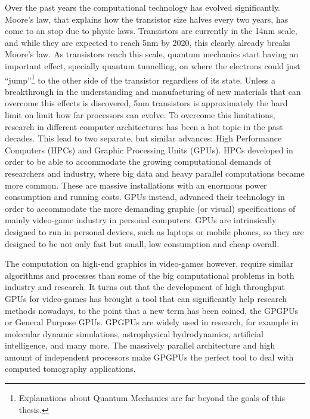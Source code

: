 Over the past years the computational technology has evolved significantly. Moore's law, that explains how the transistor size halves every two years, has come to an stop due to physic laws. Transistors  are currently in the 14nm scale, and while they are expected to reach 5nm by 2020, this clearly already breaks Moore's law. As transistors reach this scale, quantum mechanics start having an important effect, specially quantum tunnelling, on where the electrons could just ``jump''\footnote{Explanations about Quantum Mechanics are far beyond the goals of this thesis.} to the other side of the transistor regardless of its state. Unless a breakthrough in the understanding and manufacturing of new materials that can overcome this effects is discovered, 5nm transistors is approximately the hard limit on limit how far processors can evolve. To overcome this limitations, research in different computer architectures has been a hot topic in the past decades. This lead to two separate, but similar advances: High Performance Computers (HPCs) and Graphic Processing Units (GPUs). HPCs developed in order to be able to accommodate the growing computational demands of researchers and industry, where big data and heavy parallel computations became more common. These are massive installations with an enormous power consumption and running costs. GPUs instead, advanced their technology in order to accommodate the more demanding graphic (or visual) specifications of mainly video-game industry in personal computers. GPUs are intrinsically designed to run in personal devices, such as laptops or mobile phones, so they are designed to be not only fast but small, low consumption and cheap overall.

The computation on high-end graphics in video-games however, require similar algorithms and processes than some of the big computational problems in both industry and research. It turns out that the development of high throughput GPUs for video-games has brought a tool that can significantly help research methods nowadays, to the point that a new term has been coined, the GPGPUs or General Purpose GPUs. GPGPUs are widely used in research, for example in molecular dynamic simulations\cite{phillips2005scalable}, astrophysical hydrodynamics\cite{CHOLLA}, artificial intelligence\cite{Tensorflow}, and many more. The massively parallel architecture and high amount of independent processors make GPGPUs the perfect tool to deal with computed tomography applications.

